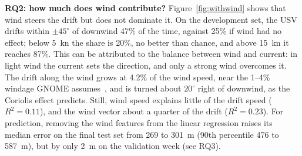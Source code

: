 \documentclass[sigconf]{acmart}
\begin{document}
\textbf{RQ2: how much does wind contribute?} Figure~\ref{fig:withwind} shows that wind steers the drift but does not dominate it. On the development set, the USV drifts within $\pm45^\circ$ of downwind 47\% of the time, against 25\% if wind had no effect; below 5~kn the share is 20\%, no better than chance, and above 15~kn it reaches 87\%. This can be attributed to the balance between wind and current: in light wind the current sets the direction, and only a strong wind overcomes it. The drift along the wind grows at 4.2\% of the wind speed, near the 1--4\% windage GNOME assumes~\cite{zelenke2012gnome}, and is turned about $20^\circ$ right of downwind, as the Coriolis effect predicts. Still, wind speed explains little of the drift speed ($R^2 = 0.11$), and the wind vector about a quarter of the drift ($R^2 = 0.23$). For prediction, removing the wind features from the linear regression raises its median error on the final test set from 269 to 301~m (90th percentile 476 to 587~m), but by only 2~m on the validation week (see RQ3).
\end{document}
